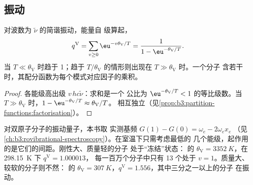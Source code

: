 \subsection*{振动}

\begin{proposition}[振动配分函数]\label{prop:b3:partition-functions:q-vib}
对波数为 $\tilde\nu$ 的简谐振动，能量自
级算起，
\[
  q^{\mathrm V} = \sum_{v\ge0}\eu^{-v\theta_{\mathrm V}/T} = \frac{1}{1 - \eu^{-\theta_{\mathrm V}/T}} .
\]
当 $T \ll \theta_{\mathrm V}$ 时趋于 1；趋于 $T/\theta_{\mathrm V}$ 的情形则出现在 $T \gg \theta_{\mathrm V}$ 时。一个分子
含若干时，其配分函数为每个模式对应因子的乘积。
\end{proposition}

\begin{proof}
各能级高出级 $v\,hc\tilde\nu$：求和是一个
公比为 $\eu^{-\theta_{\mathrm V}/T} < 1$ 的等比级数。当 $T \gg \theta_{\mathrm V}$ 时，$1 - \eu^{-\theta_{\mathrm V}/T} \approx \theta_{\mathrm V}/T$。
相互独立（见\cref{prop:b3:partition-functions:factorisation}）。
\end{proof}

对双原子分子的振动量子，本书取
实测基频 $G(1) - G(0) = \omega_e - 2\omega_ex_e$
（见\cref{ch:b3:rovibrational-spectroscopy}）。在室温下只需考虑最低的
几个能级，起作用的是它们的间距。刚性大、质量轻的分子
处于“冻结”状态： 的 $\theta_{\mathrm V} = \qty{3352}{K}$，在 \qty{298.15}{K} 下 $q^{\mathrm V} = 1.000013$，
每一百万个分子中只有 13 个处于 $v = 1$。质量大、较软的分子则不然：
的 $\theta_{\mathrm V} = \qty{307}{K}$，$q^{\mathrm V} = 1.556$，其中三分之一以上的分子
在振动。


